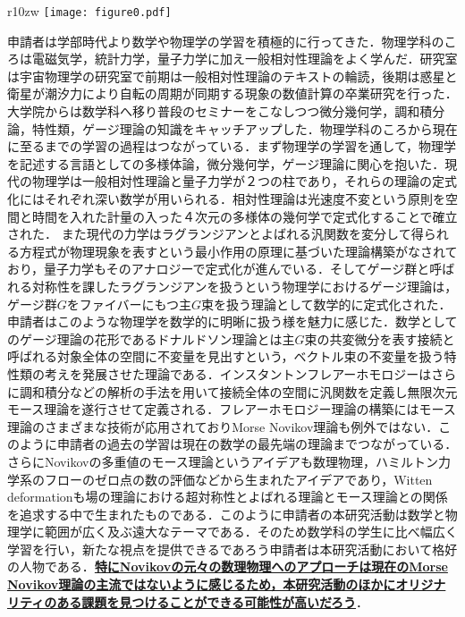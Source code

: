 \documentclass[11pt,a4j,dvipdfmx]{jarticle} 					%
\newcommand{\研究課題名}{象の卵}
\newcommand{\研究機関名}{京都大学}
\newcommand{\研究代表者氏名}{福士謙二}
\begin{document}
\noindent
{}


\begin{wrapfigure}{r}{10zw}
    \vspace*{-\intextsep} %
	\texttt{[image: figure0.pdf]}

\end{wrapfigure}



申請者は学部時代より数学や物理学の学習を積極的に行ってきた．物理学科のころは電磁気学，統計力学，量子力学に加え一般相対性理論をよく学んだ．研究室は宇宙物理学の研究室で前期は一般相対性理論のテキストの輪読，後期は惑星と衛星が潮汐力により自転の周期が同期する現象の数値計算の卒業研究を行った．大学院からは数学科へ移り普段のセミナーをこなしつつ微分幾何学，調和積分論，特性類，ゲージ理論の知識をキャッチアップした．物理学科のころから現在に至るまでの学習の過程はつながっている．まず物理学の学習を通して，物理学を記述する言語としての多様体論，微分幾何学，ゲージ理論に関心を抱いた．現代の物理学は一般相対性理論と量子力学が２つの柱であり，それらの理論の定式化にはそれぞれ深い数学が用いられる．相対性理論は光速度不変という原則を空間と時間を入れた計量の入った４次元の多様体の幾何学で定式化することで確立された．
また現代の力学はラグランジアンとよばれる汎関数を変分して得られる方程式が物理現象を表すという最小作用の原理に基づいた理論構築がなされており，量子力学もそのアナロジーで定式化が進んでいる．そしてゲージ群と呼ばれる対称性を課したラグランジアンを扱うという物理学におけるゲージ理論は，ゲージ群$G$をファイバーにもつ主$G$束を扱う理論として数学的に定式化された．申請者はこのような物理学を数学的に明晰に扱う様を魅力に感じた．数学としてのゲージ理論の花形であるドナルドソン理論とは主$G$束の共変微分を表す接続と呼ばれる対象全体の空間に不変量を見出すという，ベクトル束の不変量を扱う特性類の考えを発展させた理論である．インスタントンフレアーホモロジーはさらに調和積分などの解析の手法を用いて接続全体の空間に汎関数を定義し無限次元モース理論を遂行させて定義される．フレアーホモロジー理論の構築にはモース理論のさまざまな技術が応用されておりMorse Novikov理論も例外ではない．このように申請者の過去の学習は現在の数学の最先端の理論までつながっている．
さらにNovikovの多重値のモース理論というアイデアも数理物理，ハミルトン力学系のフローのゼロ点の数の評価などから生まれたアイデアであり，Witten deformationも場の理論における超対称性とよばれる理論とモース理論との関係を追求する中で生まれたものである．このように申請者の本研究活動は数学と物理学に範囲が広く及ぶ遠大なテーマである．そのため数学科の学生に比べ幅広く学習を行い，新たな視点を提供できるであろう申請者は本研究活動において格好の人物である．\textbf{\ul{特にNovikovの元々の数理物理へのアプローチは現在のMorse Novikov理論の主流ではないように感じるため，本研究活動のほかにオリジナリティのある課題を見つけることができる可能性が高いだろう}}．
\end{document}
